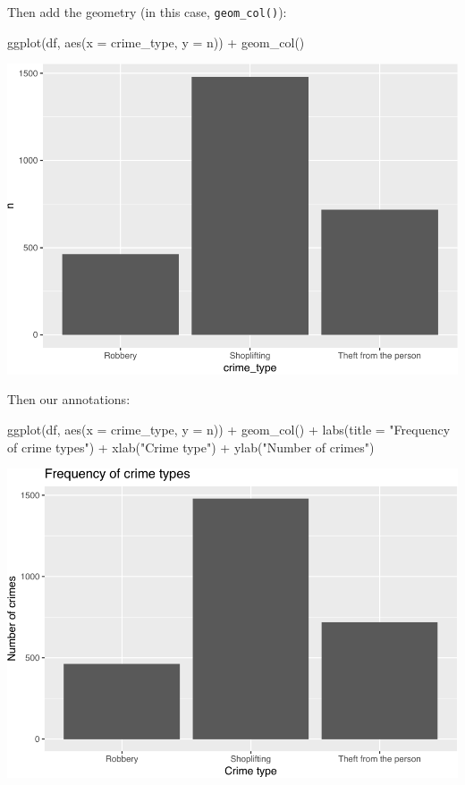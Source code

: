 \documentclass[
]{book}
\newenvironment{Shaded}{\begin{snugshade}}{\end{snugshade}}
\newcommand{\AttributeTok}[1]{\textcolor[rgb]{0.77,0.63,0.00}{#1}}
\newcommand{\FunctionTok}[1]{\textcolor[rgb]{0.00,0.00,0.00}{#1}}
\newcommand{\NormalTok}[1]{#1}
\newcommand{\SpecialCharTok}[1]{\textcolor[rgb]{0.00,0.00,0.00}{#1}}
\newcommand{\StringTok}[1]{\textcolor[rgb]{0.31,0.60,0.02}{#1}}
\begin{document}
Then add the geometry (in this case, \texttt{geom\_col()}):

\begin{Shaded}
\begin{Highlighting}[]
\FunctionTok{ggplot}\NormalTok{(df, }\FunctionTok{aes}\NormalTok{(}\AttributeTok{x =}\NormalTok{ crime\_type, }\AttributeTok{y =}\NormalTok{ n)) }\SpecialCharTok{+} 
  \FunctionTok{geom\_col}\NormalTok{()}
\end{Highlighting}
\end{Shaded}

\includegraphics{crime_mapping_files/figure-latex/unnamed-chunk-9-1.pdf}

Then our annotations:

\begin{Shaded}
\begin{Highlighting}[]
\FunctionTok{ggplot}\NormalTok{(df, }\FunctionTok{aes}\NormalTok{(}\AttributeTok{x =}\NormalTok{ crime\_type, }\AttributeTok{y =}\NormalTok{ n)) }\SpecialCharTok{+} 
  \FunctionTok{geom\_col}\NormalTok{() }\SpecialCharTok{+} 
  \FunctionTok{labs}\NormalTok{(}\AttributeTok{title =} \StringTok{"Frequency of crime types"}\NormalTok{) }\SpecialCharTok{+} 
  \FunctionTok{xlab}\NormalTok{(}\StringTok{"Crime type"}\NormalTok{) }\SpecialCharTok{+} 
  \FunctionTok{ylab}\NormalTok{(}\StringTok{"Number of crimes"}\NormalTok{)}
\end{Highlighting}
\end{Shaded}

\includegraphics{crime_mapping_files/figure-latex/unnamed-chunk-10-1.pdf}
\end{document}
